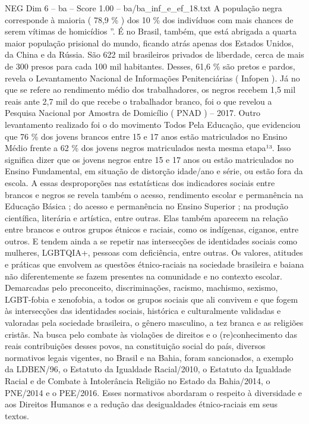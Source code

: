 \begin{textsample}{NEG Dim 6 – ba – Score 1.00 – ba/ba\_inf\_e\_ef\_18.txt}
A população negra corresponde à maioria ( 78,9 \% ) dos 10 \% dos indivíduos com mais chances de serem vítimas de homicídios ”.
É no Brasil, também, que está abrigada a quarta maior população prisional do mundo, ficando atrás apenas dos Estados Unidos, da China e da Rússia.
São 622 mil brasileiros privados de liberdade, cerca de mais de 300 presos para cada 100 mil habitantes.
Desses, 61,6 \% são pretos e pardos, revela o Levantamento Nacional de Informações Penitenciárias ( Infopen ).
Já no que se refere ao rendimento médio dos trabalhadores, os negros recebem 1,5 mil reais ante 2,7 mil do que recebe o trabalhador branco, foi o que revelou a Pesquisa Nacional por Amostra de Domicílio ( PNAD ) – 2017.
Outro levantamento realizado foi o do movimento Todos Pela Educação, que evidenciou que 76 \% dos jovens brancos entre 15 e 17 anos estão matriculados no Ensino Médio frente a 62 \% dos jovens negros matriculados nesta mesma etapa¹³.
Isso significa dizer que os jovens negros entre 15 e 17 anos ou estão matriculados no Ensino Fundamental, em situação de distorção idade/ano e série, ou estão fora da escola.
A essas desproporções nas estatísticas dos indicadores sociais entre brancos e negros se revela também o acesso, rendimento escolar e permanência na Educação Básica ; do acesso e permanência no Ensino Superior ; na produção científica, literária e artística, entre outras.
Elas também aparecem na relação entre brancos e outros grupos étnicos e raciais, como os indígenas, ciganos, entre outros.
E tendem ainda a se repetir nas intersecções de identidades sociais como mulheres, LGBTQIA+, pessoas com deficiência, entre outras.
Os valores, atitudes e práticas que envolvem as questões étnico-raciais na sociedade brasileira e baiana não diferentemente se fazem presentes na comunidade e no contexto escolar.
Demarcadas pelo preconceito, discriminações, racismo, machismo, sexismo, LGBT-fobia e xenofobia, a todos os grupos sociais que ali convivem e que fogem às intersecções das identidades sociais, histórica e culturalmente validadas e valoradas pela sociedade brasileira, o gênero masculino, a tez branca e as religiões cristãs.
Na busca pelo combate às violações de direitos e o (re)conhecimento das reais contribuições desses povos, na constituição social do país, diversos normativos legais vigentes, no Brasil e na Bahia, foram sancionados, a exemplo da LDBEN/96, o Estatuto da Igualdade Racial/2010, o Estatuto da Igualdade Racial e de Combate à Intolerância Religião no Estado da Bahia/2014, o PNE/2014 e o PEE/2016.
Esses normativos abordaram o respeito à diversidade e aos Direitos Humanos e a redução das desigualdades étnico-raciais em seus textos.

\end{textsample}
